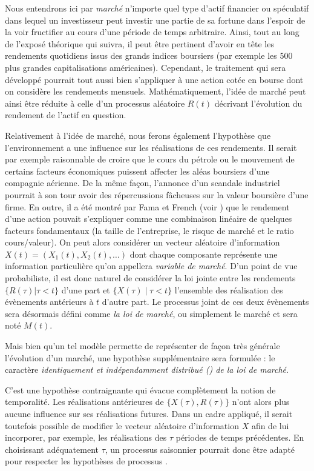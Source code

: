 Nous entendrons ici par \textit{marché} n'importe quel type d'actif financier ou
spéculatif dans lequel un investisseur peut investir une partie de sa fortune dans
l'espoir de la voir fructifier au cours d'une période de temps arbitraire. Ainsi, tout au
long de l'exposé théorique qui suivra, il peut être pertinent d'avoir en tête les
rendements quotidiens issus des grands indices boursiers (par exemple les 500 plus grandes
capitalisations américaines). Cependant, le traitement qui sera développé pourrait tout
aussi bien s'appliquer à une action cotée en bourse dont on considère les rendements
mensuels.  Mathématiquement, l'idée de marché peut ainsi être réduite à celle d'un
processus aléatoire $R(t)$ décrivant l'évolution du rendement de l'actif en question.

Relativement à l'idée de marché, nous ferons également l'hypothèse que l'environnement a
une influence sur les réalisations de ces rendements. Il serait par exemple raisonnable de
croire que le cours du pétrole ou le mouvement de certains facteurs économiques puissent
affecter les aléas boursiers d'une compagnie aérienne. De la même façon, l'annonce d'un
scandale industriel pourrait à son tour avoir des répercussions fâcheuses sur la valeur
boursière d'une firme. En outre, il a été montré par Fama et French (voir
\cite{fama1996multifactor}) que le rendement d'une action pouvait s'expliquer comme une
combinaison linéaire de quelques facteurs fondamentaux (la taille de l'entreprise, le
risque de marché et le ratio cours/valeur). On peut alors considérer un vecteur aléatoire
d'information $X(t) = (X_1(t), X_2(t), \dots)$ dont chaque composante représente une
information particulière qu'on appellera \textit{variable de marché}. D'un point de vue
probabiliste, il est donc naturel de considérer la loi jointe entre les rendements
$\{R(\tau) | \tau < t\}$ d'une part et $\{X(\tau) \mid \tau < t\}$ l'ensemble des réalisation des
évènements antérieurs à $t$ d'autre part. Le processus joint de ces deux évènements sera
désormais défini comme \textit{la loi de marché}, ou simplement le marché et sera noté
$M(t)$.


Mais bien qu'un tel modèle permette de représenter de façon très générale l'évolution d'un
marché, une hypothèse supplémentaire sera formulée : le caractère \textit{identiquement et
  indépendamment distribué (\iid) de la loi de marché}.

C'est une hypothèse contraignante qui évacue complètement la notion de temporalité. Les
réalisations antérieures de $\{X(\tau),R(\tau)\}$ n'ont alors plus aucune influence sur ses
réalisations futures. Dans un cadre appliqué, il serait toutefois possible de modifier le
vecteur aléatoire d'information $X$ afin de lui incorporer, par exemple, les réalisations
des $\tau$ périodes de temps précédentes. En choisissant adéquatement $\tau$, un processus
saisonnier pourrait donc être adapté pour respecter les hypothèses de processus \iid.

